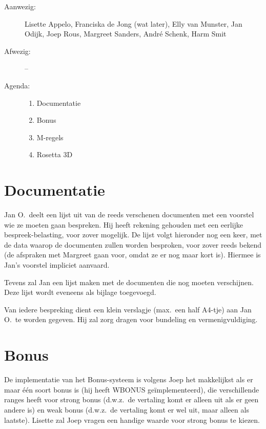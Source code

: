 

   \RosSupersedes{-}
   \MakeRosTitle
%
%
\begin{description}
\item[Aanwezig:] Lisette Appelo, Franciska de Jong (wat later), 
                 Elly van Munster, Jan Odijk, Joep Rous, Margreet Sanders,
                 Andr\'{e} Schenk, Harm Smit
\item[Afwezig:] --
\item[Agenda:]\mbox{}
  \begin{enumerate}
  \item Documentatie
  \item Bonus
  \item M-regels
  \item Rosetta 3D
  \end{enumerate}
\end{description}

\section{ Documentatie}
Jan O.\ deelt een lijst uit van de reeds verschenen documenten met een voorstel 
wie ze moeten gaan bespreken. Hij heeft rekening gehouden met een eerlijke 
bespreek-belasting, voor zover mogelijk. De lijst volgt hieronder nog een keer, 
met de data waarop de documenten zullen worden besproken, voor zover reeds 
bekend (de afspraken met Margreet gaan voor, omdat ze er nog maar kort is). 
Hiermee is Jan's voorstel impliciet aanvaard.

Tevens zal Jan een lijst maken met de documenten die nog moeten 
ver\-schij\-nen.
Deze lijst wordt eveneens als bijlage toegevoegd.

Van iedere bespreking dient een klein verslagje (max.\ een half A4-tje) aan Jan 
O.\ te worden gegeven. Hij zal zorg dragen voor bundeling en vermenigvuldiging.

\section{Bonus}
De implementatie van het Bonus-systeem is volgens Joep het makkelijkst als er 
maar \'{e}\'{e}n soort bonus is (hij heeft WBONUS ge\"{i}mplementeerd), die 
verschillende ranges heeft voor strong bonus (d.w.z.\ de vertaling komt er 
alleen uit als er geen andere is) en weak bonus (d.w.z.\ de vertaling komt er 
wel uit, maar alleen als laatste). Lisette zal Joep vragen een handige waarde 
voor strong bonus te kiezen.

